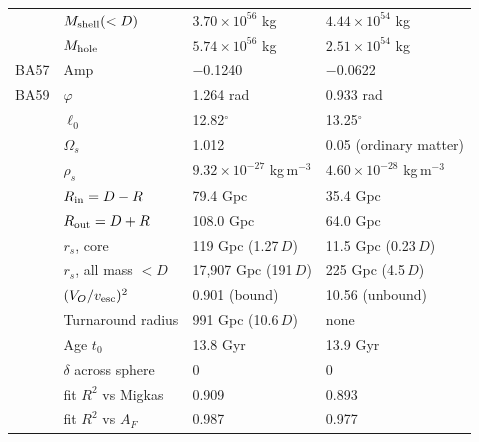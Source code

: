 \documentclass[10pt,letterpaper]{article}
\begin{document}
\begin{minipage}[t]{0.48\textwidth}
\begin{tabular}{llll}
 & $M_{\rm shell}(<D)$ & $3.70\times10^{56}$ kg & $4.44\times10^{54}$ kg\\
 & $M_{\rm hole}$ & $5.74\times10^{56}$ kg & $2.51\times10^{54}$ kg\\
BA57 & Amp & $-$0.1240 & $-$0.0622\\
BA59 & $\varphi$ & 1.264 rad & 0.933 rad\\
 & $\ell_0$ & 12.82$^\circ$ & 13.25$^\circ$\\
\midrule
 & $\Omega_s$ & 1.012 & 0.05 (ordinary matter)\\
 & $\rho_s$ & $9.32\times10^{-27}$ kg\,m$^{-3}$ & $4.60\times10^{-28}$ kg\,m$^{-3}$\\
 & $R_{\rm in}=D-R$ & 79.4 Gpc & 35.4 Gpc\\
 & $R_{\rm out}=D+R$ & 108.0 Gpc & 64.0 Gpc\\
 & $r_s$, core & 119 Gpc (1.27\,$D$) & 11.5 Gpc (0.23\,$D$)\\
 & $r_s$, all mass $<D$ & 17{,}907 Gpc (191\,$D$) & 225 Gpc (4.5\,$D$)\\
\midrule
 & $(V_O/v_{\rm esc})^2$ & 0.901 (bound) & 10.56 (unbound)\\
 & Turnaround radius & 991 Gpc (10.6\,$D$) & none\\
 & Age $t_0$ & 13.8 Gyr & 13.9 Gyr\\
 & $\delta$ across sphere & 0 & 0\\
 & fit $R^2$ vs Migkas & 0.909 & 0.893\\
 & fit $R^2$ vs $A_F$ & 0.987 & 0.977\\
\bottomrule
\end{tabular}
\end{minipage}
\par\vspace{6pt}
\end{document}
